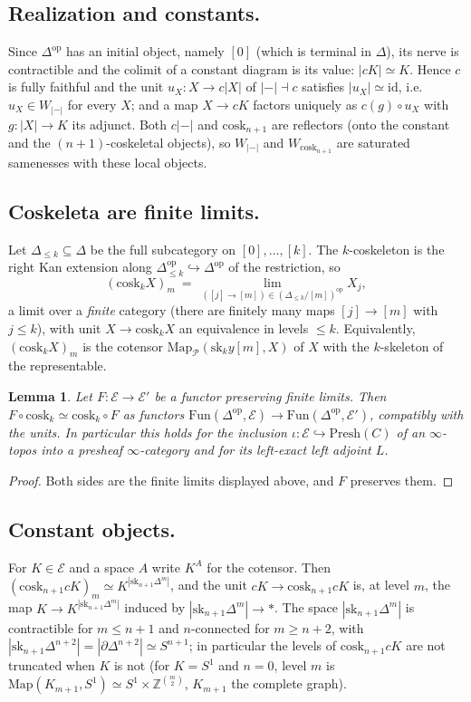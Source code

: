 \documentclass[11pt]{amsart}
\newtheorem{lem}[thm]{Lemma}
\theoremstyle{definition}
\newcommand{\Presh}{\mathrm{Presh}}
\newcommand{\Map}{\mathrm{Map}}
\newcommand{\cosk}{\mathrm{cosk}}
\newcommand{\sk}{\mathrm{sk}}
\newcommand{\Fun}{\mathrm{Fun}}
\newcommand{\E}{\mathcal E}
\newcommand{\sP}{\mathcal P}
\newcommand{\re}{|{-}|}
\begin{document}
\subsection{Realization and constants.}
Since $\Delta^{\mathrm{op}}$ has an initial object, namely $[0]$ (which is
terminal in $\Delta$), its nerve is contractible and the colimit of a
constant diagram is its value: $|cK|\simeq K$. Hence $c$ is fully faithful and
the unit $u_X\colon X\to c|X|$ of $\re\dashv c$ satisfies $|u_X|\simeq
\mathrm{id}$, i.e.\ $u_X\in W_{\re}$ for every $X$; and a map $X\to cK$
factors uniquely as $c(g)\circ u_X$ with $g\colon|X|\to K$ its adjunct. Both
$c\re$ and $\cosk_{n+1}$ are reflectors (onto the constant and the
$(n{+}1)$-coskeletal objects), so $W_{\re}$ and $W_{\cosk_{n+1}}$ are saturated
samenesses with these local objects.

\subsection{Coskeleta are finite limits.}
Let $\Delta_{\le k}\subseteq\Delta$ be the full subcategory on $[0],\dots,[k]$.
The $k$-coskeleton is the right Kan extension along $\Delta_{\le k}^{\mathrm{op}}
\hookrightarrow\Delta^{\mathrm{op}}$ of the restriction, so
\[
(\cosk_kX)_m\ =\ \lim_{([j]\to[m])\in(\Delta_{\le k}/[m])^{\mathrm{op}}}X_j ,
\]
a limit over a \emph{finite} category (there are finitely many maps
$[j]\to[m]$ with $j\le k$), with unit $X\to\cosk_kX$ an equivalence in levels
$\le k$. Equivalently, $(\cosk_kX)_m$ is the cotensor
$\Map_{\sP}(\sk_ky[m],X)$ of $X$ with the $k$-skeleton of the representable.

\begin{lem}\label{lem:lex}
Let $F\colon\E\to\E'$ be a functor preserving finite limits. Then
$F\circ\cosk_k\simeq\cosk_k\circ F$ as functors $\Fun(\Delta^{\mathrm{op}},\E)\to
\Fun(\Delta^{\mathrm{op}},\E')$, compatibly with the units. In particular this
holds for the inclusion $\iota\colon\E\hookrightarrow\Presh(C)$ of an
$\infty$-topos into a presheaf $\infty$-category and for its left-exact left
adjoint $L$.
\end{lem}
\begin{proof}
Both sides are the finite limits displayed above, and $F$ preserves them.
\end{proof}

\subsection{Constant objects.}
For $K\in\E$ and a space $A$ write $K^A$ for the cotensor. Then
$(\cosk_{n+1}cK)_m\simeq K^{|\sk_{n+1}\Delta^m|}$, and the unit $cK\to\cosk_{n+1}cK$
is, at level $m$, the map $K\to K^{|\sk_{n+1}\Delta^m|}$ induced by
$|\sk_{n+1}\Delta^m|\to\ast$. The space $|\sk_{n+1}\Delta^m|$ is contractible for
$m\le n+1$ and $n$-connected for $m\ge n+2$, with
$|\sk_{n+1}\Delta^{n+2}|=|\partial\Delta^{n+2}|\simeq S^{n+1}$; in particular the
levels of $\cosk_{n+1}cK$ are not truncated when $K$ is not (for
$K=S^1$ and $n=0$, level $m$ is $\Map(K_{m+1},S^1)\simeq S^1\times\mathbb Z^{\binom m2}$,
$K_{m+1}$ the complete graph).
\end{document}
